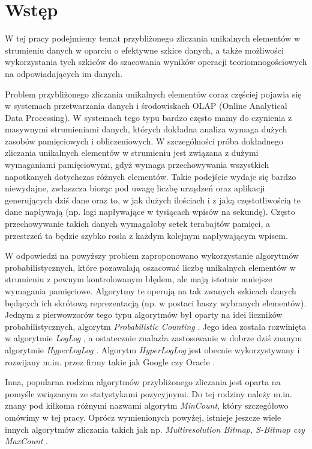 \chapter{Wstęp}
\thispagestyle{chapterBeginStyle}

W tej pracy podejmiemy temat przybliżonego zliczania unikalnych elementów w strumieniu danych w oparciu o efektywne szkice danych, a także możliwości wykorzystania tych szkiców do szacowania wyników operacji teoriomnogościowych na odpowiadających im danych.

Problem przybliżonego zliczania unikalnych elementów coraz częściej pojawia się w systemach przetwarzania danych i środowiskach OLAP (Online Analytical Data Processing).
W systemach tego typu bardzo często mamy do czynienia z masywnymi strumieniami danych, których dokładna  analiza wymaga dużych zasobów pamięciowych i obliczeniowych. W szczególności próba dokładnego zliczania unikalnych elementów w strumieniu jest związana z dużymi wymaganiami pamięciowymi,  gdyż wymaga przechowywania wszystkich napotkanych dotychczas różnych elementów.
Takie podejście wydaje się bardzo niewydajne,
zwłaszcza biorąc pod uwagę liczbę urządzeń oraz aplikacji generujących dziś dane 
oraz to,  w jak dużych ilościach i z jaką częstotliwością te dane napływają
(np. logi napływające w tysiącach wpisów na sekundę).
Często przechowywanie takich danych wymagałoby
setek terabajtów pamięci, a przestrzeń ta będzie szybko rosła z każdym kolejnym napływającym wpisem.

W odpowiedzi na powyższy problem zaproponowano wykorzystanie algorytmów probabilistycznych, które pozawalają oszacować liczbę unikalnych elementów w strumieniu z pewnym kontrolowanym błędem, ale mają istotnie mniejsze wymagania pamięciowe. Algorytmy te operują na tak zwanych szkicach danych będących ich skrótową reprezentacją (np. w postaci haszy wybranych elementów). Jednym z pierwowzorów tego typu algorytmów był oparty na idei liczników probabilistycznych, algorytm \textit{Probabilistic Counting} \cite{linear}. 
Jego idea została rozwinięta w algorytmie \textit{LogLog} \cite{loglog},
a ostatecznie znalazła zastosowanie w dobrze dziś znanym
algorytmie \textit{HyperLogLog} \cite{hll}.
Algorytm \textit{HyperLogLog} jest obecnie wykorzystywany i rozwijany m.in. przez firmy takie 
jak Google \cite{hllpp} czy Oracle \cite{oracle}.  

Inna, popularna rodzina algorytmów przybliżonego zliczania jest oparta na pomyśle związanym ze statystykami pozycyjnymi. Do tej rodziny należy m.in. znany pod kilkoma różnymi nazwami algorytm \textit{MinCount}, który szczegółowo omówimy w tej pracy. Oprócz wymienionych powyżej, istnieje jeszcze wiele innych algorytmów zliczania takich jak np. \textit{Multiresolution Bitmap, S-Bitmap czy MaxCount}
\cite{streamed}.

